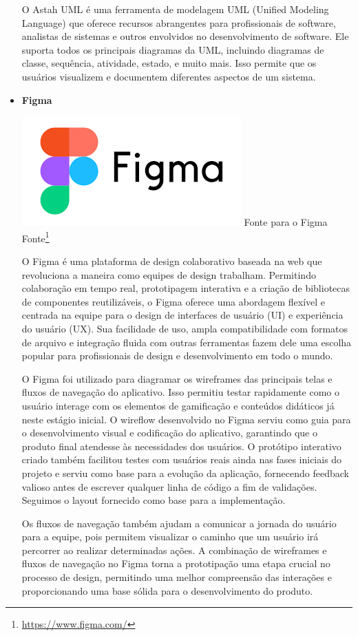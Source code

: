 \begin{itemize}
O Astah UML é uma ferramenta de modelagem UML (Unified Modeling Language) que oferece recursos abrangentes para profissionais de software, analistas de sistemas e outros envolvidos no desenvolvimento de software. Ele suporta todos os principais diagramas da UML, incluindo diagramas de classe, sequência, atividade, estado, e muito mais. Isso permite que os usuários visualizem e documentem diferentes aspectos de um sistema.
    \item \textbf{Figma}
    \begin{center}
    \includegraphics[width=0.5\linewidth]{figuras/Figma.png}
    \label{fig:Figma}
    Fonte para o Figma Fonte\footnote{\url{https://www.figma.com/}}
\end{center}

O Figma é uma plataforma de design colaborativo baseada na web que revoluciona a maneira como equipes de design trabalham. Permitindo colaboração em tempo real, prototipagem interativa e a criação de bibliotecas de componentes reutilizáveis, o Figma oferece uma abordagem flexível e centrada na equipe para o design de interfaces de usuário (UI) e experiência do usuário (UX). Sua facilidade de uso, ampla compatibilidade com formatos de arquivo e integração fluida com outras ferramentas fazem dele uma escolha popular para profissionais de design e desenvolvimento em todo o mundo.

O Figma foi utilizado para diagramar os wireframes das principais telas e fluxos de navegação do aplicativo. Isso permitiu testar rapidamente como o usuário interage com os elementos de gamificação e conteúdos didáticos já neste estágio inicial. O wireflow desenvolvido no Figma serviu como guia para o desenvolvimento visual e codificação do aplicativo, garantindo que o produto final atendesse às necessidades dos usuários. O protótipo interativo criado também facilitou testes com usuários reais ainda nas fases iniciais do projeto e serviu como base para a evolução da aplicação, fornecendo feedback valioso antes de escrever qualquer linha de código a fim de validações. Seguimos o layout fornecido como base para a implementação. 

Os fluxos de navegação também ajudam a comunicar a jornada do usuário para a equipe, pois permitem visualizar o caminho que um usuário irá percorrer ao realizar determinadas ações. A combinação de wireframes e fluxos de navegação no Figma torna a prototipação uma etapa crucial no processo de design, permitindo uma melhor compreensão das interações e proporcionando uma base sólida para o desenvolvimento do produto.
   
\end{itemize}

